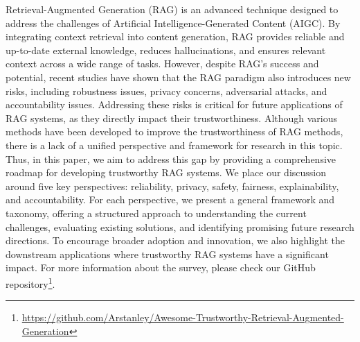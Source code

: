 \vspace{2ex}
Retrieval-Augmented Generation (RAG) is an advanced technique designed to address the challenges of Artificial Intelligence-Generated Content (AIGC). By integrating context retrieval into content generation, RAG provides reliable and up-to-date external knowledge, reduces hallucinations, and ensures relevant context across a wide range of tasks. However, despite RAG's success and potential, recent studies have shown
that the RAG paradigm also introduces new risks, including robustness issues,
privacy concerns, adversarial attacks, and accountability issues. Addressing
these risks is critical for future applications of RAG systems, as they
directly impact their trustworthiness. Although various methods have been
developed to improve the trustworthiness of RAG methods, there is a lack of a unified
perspective and framework for research in this topic. Thus, in this paper, we
aim to address this gap by providing a comprehensive roadmap for developing
trustworthy RAG systems. We place our discussion around five key perspectives: reliability, privacy, safety, fairness, explainability, and accountability. For each perspective, we present a general framework and taxonomy, offering a structured approach to understanding the current challenges, evaluating existing solutions, and identifying promising future research directions. To encourage broader adoption and innovation, we also highlight the downstream applications where trustworthy RAG systems have a significant impact. For more information about the survey, please check our GitHub repository\footnote{\url{https://github.com/Arstanley/Awesome-Trustworthy-Retrieval-Augmented-Generation}}.
